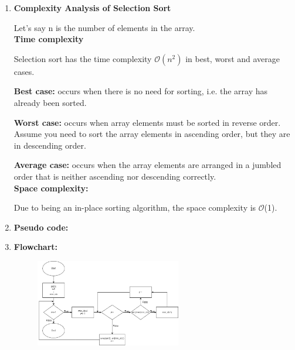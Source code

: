 \documentclass[11pt,a4paper]{article}
\begin{document}
{\begin{enumerate}[label=\textbf{\arabic*})]
				The selection sort simply partition the list into two main logical parts, the sorted part and the unsorted part. Any iteration picks a value from the unsorted and places it in the sorted list, making the sort partition grow in size while the unsorted partition shrinks for each iteration. When adding to the sorted list, the algorithm makes sure that the value is added at the right position to ensure an order sequence of the sorted partition. The process is terminated when the number of items or the size of the unsorted is one (1). The procedure to select a value to be moved to the sorted list will return minimum value or maximum value in the unsorted partition, which will be swapped to position the item correctly. 
				\\[12pt]
				\item \textbf{Complexity Analysis of Selection Sort}
					
					Let’s say n is the number of elements in the array. 
					\\[9pt]
					\textbf{Time complexity}
					
					Selection sort has the time complexity $\mathcal{O}(n^2)$ in best, worst and average cases.
					
					\textbf{Best case:} occurs when there is no need for sorting, i.e. the array has already been sorted.
					
					\textbf{Worst case:} occurs when array elements must be sorted in reverse order. Assume you need to sort the array elements in ascending order, but they are in descending order.
					
					\textbf{Average case:} occurs when the array elements are arranged in a jumbled order that is neither ascending nor descending correctly.
					\\[9pt]
					\textbf{Space complexity:}
					
					Due to being an in-place sorting algorithm, the space complexity is $\mathcal{O}$(1).
				\\[12pt]
				\item \textbf{Pseudo code:}
				\\[12pt]
				\item \textbf{Flowchart:}
					\begin{figure}[H]
						\centering 
						\includegraphics[width=0.6\textwidth]{SelectionSort Flowchart}
					\end{figure}
				

\end{enumerate}}
\end{document}
